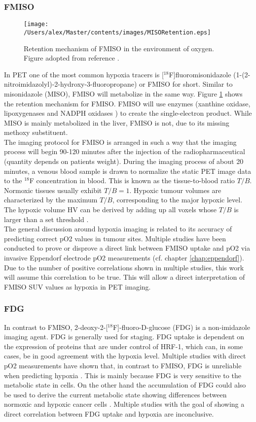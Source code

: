 \subsubsection{FMISO}
\begin{figure}[hb]
\centering
\texttt{[image: /Users/alex/Master/contents/images/MISORetention.eps]}
\vspace{1cm}
\caption{Retention mechanism of FMISO in the environment of oxygen. Figure adopted from reference \cite{pmid18523070}.}
\label{fig:MISORetention}
\end{figure}
In PET one of the most common hypoxia tracers is [$^{18}$F]fluoromisonidazole (1-(2-nitroimidazolyl)-2-hydroxy-3-fluoropropane) or FMISO for short. Similar to misonidazole (MISO), FMISO will metabolize in the same way. Figure \ref{fig:MISORetention} shows the retention mechanism for FMISO. FMISO will use enzymes (xanthine oxidase, lipoxygenases and NADPH oxidases \cite{pmid18523070}) to create the single-electron product. While MISO is mainly metabolized in the liver, FMISO is not, due to its missing methoxy substituent.\\The imaging protocol for FMISO is arranged in such a way that the imaging process will begin 90-120 minutes after the injection of the radiopharmaceutical (quantity depends on patients weight). During the imaging process of about 20 minutes, a venous blood sample is drawn to normalize the static PET image data to the $^{18}$F concentration in blood. This is known as the tissue-to-blood ratio $T/B$. Normoxic tissues usually exhibit $T/B = 1$. Hypoxic tumour volumes are characterized by the maximum $T/B$, corresponding to the major hypoxic level. The hypoxic volume HV can be derived by adding up all voxels whose $T/B$ is larger than a set threshold \cite{pmid18523070}.\\The general discussion around hypoxia imaging is related to its accuracy of predicting correct pO2 values in tumour sites. Multiple studies have been conducted to prove or disprove a direct link between FMISO uptake and pO2 via invasive Eppendorf electrode pO2 measurements (cf. chapter \ref{chap:eppendorf}). Due to the number of positive correlations shown in multiple studies, this work will assume this correlation to be true. This will allow a direct interpretation of FMISO SUV values as hypoxia in PET imaging.
\subsubsection{FDG}
In contrast to FMISO, 2-deoxy-2-[$^{18}$F]-fluoro-D-glucose (FDG) is a non-imidazole imaging agent. FDG is generally used for staging. FDG uptake is dependent on the expression of proteins that are under control of HRF-1, which can, in some cases, be in good agreement with the hypoxia level. Multiple studies with direct pO2 measurements have shown that, in contrast to FMISO, FDG is unreliable when predicting hypoxia \cite{pmid18682937}. This is mainly because FDG is very sensitive to the metabolic state in cells. On the other hand the accumulation of FDG could also be used to derive the current metabolic state showing differences between normoxic and hypoxic cancer cells \cite{pmid17400370}. Multiple studies with the goal of showing a direct correlation between FDG uptake and hypoxia are inconclusive.
